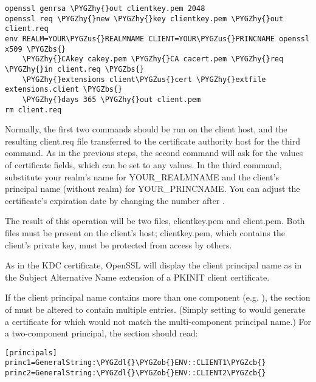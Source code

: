 \documentclass[letterpaper,10pt,english]{sphinxmanual}
\def\PYGZbs{\char`\\}
\def\PYGZus{\char`\_}
\def\PYGZob{\char`\{}
\def\PYGZcb{\char`\}}
\def\PYGZdl{\char`\$}
\def\PYGZhy{\char`\-}
\begin{document}
\begin{Verbatim}[commandchars=\\\{\}]
openssl genrsa \PYGZhy{}out clientkey.pem 2048
openssl req \PYGZhy{}new \PYGZhy{}key clientkey.pem \PYGZhy{}out client.req
env REALM=YOUR\PYGZus{}REALMNAME CLIENT=YOUR\PYGZus{}PRINCNAME openssl x509 \PYGZbs{}
    \PYGZhy{}CAkey cakey.pem \PYGZhy{}CA cacert.pem \PYGZhy{}req \PYGZhy{}in client.req \PYGZbs{}
    \PYGZhy{}extensions client\PYGZus{}cert \PYGZhy{}extfile extensions.client \PYGZbs{}
    \PYGZhy{}days 365 \PYGZhy{}out client.pem
rm client.req
\end{Verbatim}

Normally, the first two commands should be run on the client host, and
the resulting client.req file transferred to the certificate authority
host for the third command.  As in the previous steps, the second
command will ask for the values of certificate fields, which can be
set to any values.  In the third command, substitute your realm's name
for YOUR\_REALMNAME and the client's principal name (without realm) for
YOUR\_PRINCNAME.  You can adjust the certificate's expiration date by
changing the number after .

The result of this operation will be two files, clientkey.pem and
client.pem.  Both files must be present on the client's host;
clientkey.pem, which contains the client's private key, must be
protected from access by others.

As in the KDC certificate, OpenSSL will display the client principal
name as  in the Subject Alternative Name
extension of a PKINIT client certificate.

If the client principal name contains more than one component
(e.g. ), the \code{{[}principals{]}} section of
 must be altered to contain multiple entries.
(Simply setting  to  would generate a
certificate for  which would not match the
multi-component principal name.)  For a two-component principal, the
section should read:

\begin{Verbatim}[commandchars=\\\{\}]
[principals]
princ1=GeneralString:\PYGZdl{}\PYGZob{}ENV::CLIENT1\PYGZcb{}
princ2=GeneralString:\PYGZdl{}\PYGZob{}ENV::CLIENT2\PYGZcb{}
\end{Verbatim}
\end{document}
